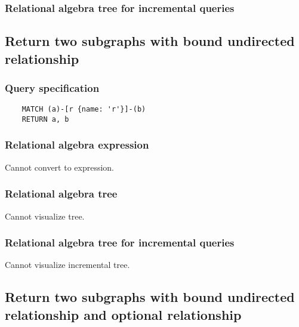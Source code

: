 	\subsubsection*{Relational algebra tree for incremental queries}

	\subsection{Return two subgraphs with bound undirected relationship}

	\subsubsection*{Query specification}

	\begin{lstlisting}
	MATCH (a)-[r {name: 'r'}]-(b)
	RETURN a, b
	\end{lstlisting}


	\subsubsection*{Relational algebra expression}

	Cannot convert to expression.

	\subsubsection*{Relational algebra tree}

	Cannot visualize tree.

	\subsubsection*{Relational algebra tree for incremental queries}

	Cannot visualize incremental tree.
	\subsection{Return two subgraphs with bound undirected relationship and optional relationship}

